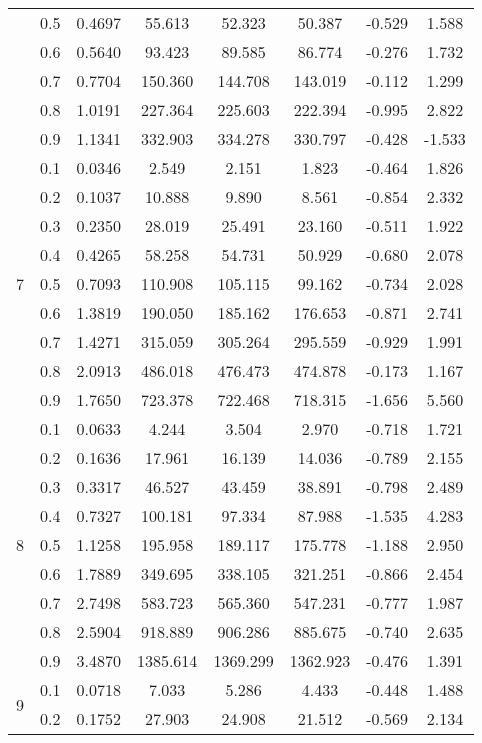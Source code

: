 \documentclass[11pt,a4paper]{report}
\begin{document}
\begin{longtable}{ | c | c || c | c | c | c | c | c | }
 & 0.5 & 0.4697 & 55.613 & 52.323 & 50.387 & -0.529 & 1.588 \\
 & 0.6 & 0.5640 & 93.423 & 89.585 & 86.774 & -0.276 & 1.732 \\
 & 0.7 & 0.7704 & 150.360 & 144.708 & 143.019 & -0.112 & 1.299 \\
 & 0.8 & 1.0191 & 227.364 & 225.603 & 222.394 & -0.995 & 2.822 \\
 & 0.9 & 1.1341 & 332.903 & 334.278 & 330.797 & -0.428 & -1.533 \\
 \hline
\multirow{9}{*}{7} & 0.1 & 0.0346 & 2.549 & 2.151 & 1.823 & -0.464 & 1.826 \\
 & 0.2 & 0.1037 & 10.888 & 9.890 & 8.561 & -0.854 & 2.332 \\
 & 0.3 & 0.2350 & 28.019 & 25.491 & 23.160 & -0.511 & 1.922 \\
 & 0.4 & 0.4265 & 58.258 & 54.731 & 50.929 & -0.680 & 2.078 \\
 & 0.5 & 0.7093 & 110.908 & 105.115 & 99.162 & -0.734 & 2.028 \\
 & 0.6 & 1.3819 & 190.050 & 185.162 & 176.653 & -0.871 & 2.741 \\
 & 0.7 & 1.4271 & 315.059 & 305.264 & 295.559 & -0.929 & 1.991 \\
 & 0.8 & 2.0913 & 486.018 & 476.473 & 474.878 & -0.173 & 1.167 \\
 & 0.9 & 1.7650 & 723.378 & 722.468 & 718.315 & -1.656 & 5.560 \\
 \hline
\multirow{9}{*}{8} & 0.1 & 0.0633 & 4.244 & 3.504 & 2.970 & -0.718 & 1.721 \\
 & 0.2 & 0.1636 & 17.961 & 16.139 & 14.036 & -0.789 & 2.155 \\
 & 0.3 & 0.3317 & 46.527 & 43.459 & 38.891 & -0.798 & 2.489 \\
 & 0.4 & 0.7327 & 100.181 & 97.334 & 87.988 & -1.535 & 4.283 \\
 & 0.5 & 1.1258 & 195.958 & 189.117 & 175.778 & -1.188 & 2.950 \\
 & 0.6 & 1.7889 & 349.695 & 338.105 & 321.251 & -0.866 & 2.454 \\
 & 0.7 & 2.7498 & 583.723 & 565.360 & 547.231 & -0.777 & 1.987 \\
 & 0.8 & 2.5904 & 918.889 & 906.286 & 885.675 & -0.740 & 2.635 \\
 & 0.9 & 3.4870 & 1385.614 & 1369.299 & 1362.923 & -0.476 & 1.391 \\
 \hline
\multirow{9}{*}{9} & 0.1 & 0.0718 & 7.033 & 5.286 & 4.433 & -0.448 & 1.488 \\
 & 0.2 & 0.1752 & 27.903 & 24.908 & 21.512 & -0.569 & 2.134 \\

\end{longtable}
\end{document}
